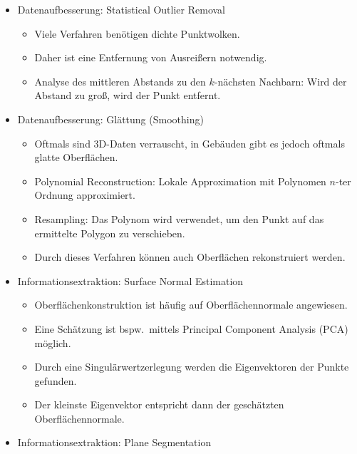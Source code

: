 \documentclass[a4paper, 11pt, accentcolor = tud3b]{tudreport}
\newcommand{\bspw}{bspw.~}
\begin{document}
					\begin{itemize}
						\item Datenaufbesserung: Statistical Outlier Removal
							\begin{itemize}
								\item Viele Verfahren benötigen dichte Punktwolken.
								\item Daher ist eine Entfernung von Ausreißern notwendig.
								\item Analyse des mittleren Abstands zu den \(k\)-nächsten Nachbarn: Wird der Abstand zu groß, wird der Punkt entfernt.
							\end{itemize}
						\item Datenaufbesserung: Glättung (Smoothing)
							\begin{itemize}
								\item Oftmals sind 3D-Daten verrauscht, in Gebäuden gibt es jedoch oftmals glatte Oberflächen.
								\item Polynomial Reconstruction: Lokale Approximation mit Polynomen \(n\)-ter Ordnung approximiert.
								\item Resampling: Das Polynom wird verwendet, um den Punkt auf das ermittelte Polygon zu verschieben.
								\item Durch dieses Verfahren können auch Oberflächen rekonstruiert werden.
							\end{itemize}
						\item Informationsextraktion: Surface Normal Estimation
							\begin{itemize}
								\item Oberflächenkonstruktion ist häufig auf Oberflächennormale angewiesen.
								\item Eine Schätzung ist \bspw mittels Principal Component Analysis (PCA) möglich.
								\item Durch eine Singulärwertzerlegung werden die Eigenvektoren der Punkte gefunden.
								\item Der kleinste Eigenvektor entspricht dann der geschätzten Oberflächennormale.
							\end{itemize}
						\item Informationsextraktion: Plane Segmentation
					\end{itemize}
\end{document}
